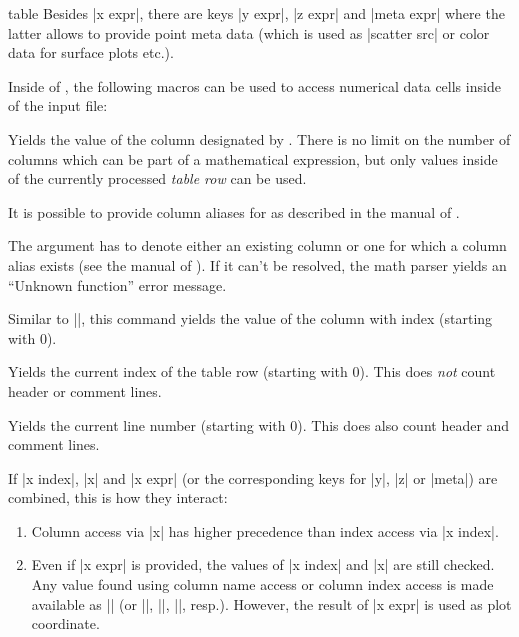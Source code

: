 {\begin{addplotoperation}[]{table}{}
	Besides |x expr|, there are keys |y expr|, |z expr| and |meta expr| where the latter allows to provide point meta data (which is used as |scatter src| or color data for surface plots etc.).

	Inside of , the following macros can be used to access numerical data cells inside of the input file:

	\begin{command}{\thisrow{}}
		Yields the value of the column designated by . There is no limit on the number of columns which can be part of a mathematical expression, but only values inside of the currently processed \emph{table row} can be used.
		
		It is possible to provide column aliases for  as described in the manual of \PGFPlotstable. 

		The argument  has to denote either an existing column or one for which a column alias exists (see the manual of \PGFPlotstable). If it can't be resolved, the math parser yields an ``Unknown function'' error message.
	\end{command}
	\begin{command}{\thisrowno{}}
		Similar to |\thisrow|, this command yields the value of the column with index  (starting with $0$). 
	\end{command}
	\begin{command}{\coordindex}
		Yields the current index of the table row (starting with $0$). This does \emph{not} count header or comment lines.		
	\end{command}
	\begin{command}{\lineno}
		Yields the current line number (starting with $0$). This does also count header and comment lines.
	\end{command}

	If |x index|, |x| and |x expr| (or the corresponding keys for |y|, |z| or |meta|) are combined, this is how they interact:
	\begin{enumerate}
		\item Column access via |x| has higher precedence than index access via |x index|.
		\item Even if |x expr| is provided, the values of |x index| and |x| are still checked. Any value found using column name access or column index access is made available as |\columnx| (or |\columny|, |\columnz|, |\columnmeta|, resp.). However, the result of |x expr| is used as plot coordinate.


\end{enumerate}
\end{addplotoperation}}
